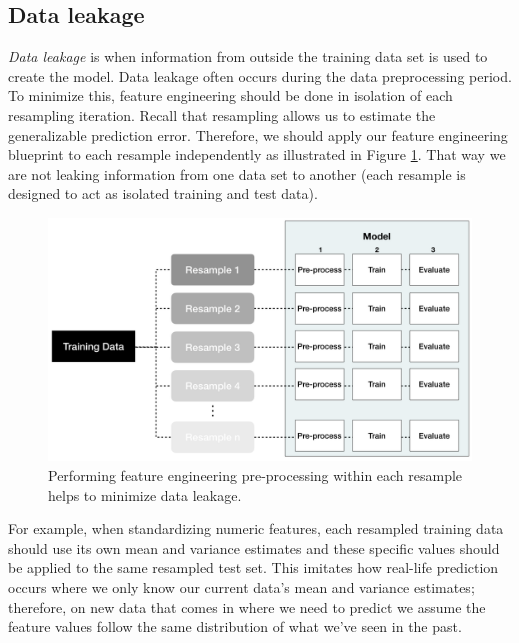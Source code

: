 \documentclass[]{krantz}
\begin{document}
\hypertarget{data-leakage}{%
\subsection{Data leakage}\label{data-leakage}}

\emph{Data leakage} is when information from outside the training data set is used to create the model. Data leakage often occurs during the data preprocessing period. To minimize this, feature engineering should be done in isolation of each resampling iteration. Recall that resampling allows us to estimate the generalizable prediction error. Therefore, we should apply our feature engineering blueprint to each resample independently as illustrated in Figure \ref{fig:minimize-leakage}. That way we are not leaking information from one data set to another (each resample is designed to act as isolated training and test data).

\begin{figure}

{\centering \includegraphics[width=0.9\linewidth]{images/minimize-leakage} 

}

\caption{Performing feature engineering pre-processing within each resample helps to minimize data leakage.}\label{fig:minimize-leakage}
\end{figure}

For example, when standardizing numeric features, each resampled training data should use its own mean and variance estimates and these specific values should be applied to the same resampled test set. This imitates how real-life prediction occurs where we only know our current data's mean and variance estimates; therefore, on new data that comes in where we need to predict we assume the feature values follow the same distribution of what we've seen in the past.
\end{document}
